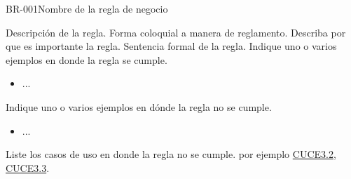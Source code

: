 



\begin{BussinesRule}[%
	\brClassification{\btEnabler}{\bcCondition}{\blStrict}
	]{BR-001}{Nombre de la regla de negocio}
	
	\BRitem[Descripción:] Descripción de la regla. Forma coloquial a manera de reglamento.
	\BRitem[Motivación:] Describa por que es importante la regla.
	\BRitem[Sentencia:] Sentencia formal de la regla.
	 Indique uno o varios ejemplos en donde la regla se cumple.
        \begin{itemize}
        	\item ...
        \end{itemize}
	
	 Indique uno o varios ejemplos en dónde la regla no se cumple.
		\begin{itemize}
        	\item ...
        \end{itemize}
	
	 Liste los casos de uso en donde la regla no se cumple. por ejemplo \hyperlink{CUCE3.2}{CUCE3.2}, \hyperlink{CUCE3.3}{CUCE3.3}.
\end{BussinesRule}

